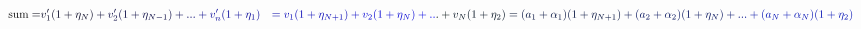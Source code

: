 \documentclass[12pt]{article}
\begin{document}
\makeatletter
\renewcommand*{\@textcolor}[3]{%
  \protect\leavevmode
  \begingroup
    \color#1{#2}#3%
  \endgroup
}
\makeatother
\begin{displaymath}
\begin{align*}\begin{align*}\begin{aligned}\mathop{\text{sum}} \mathcolor[RGB]{0,0,15}{=} & \mathcolor[RGB]{0,0,30}{v'_1(1+\eta_N)} \mathcolor[RGB]{0,0,45}{+} \mathcolor[RGB]{0,0,60}{v'_2(1+\eta_{N-1})} \mathcolor[RGB]{0,0,75}{+} \mathcolor[RGB]{0,0,90}{.} \mathcolor[RGB]{0,0,105}{.} \mathcolor[RGB]{0,0,120}{.} \mathcolor[RGB]{0,0,135}{+} \mathcolor[RGB]{0,0,150}{v'_n(1+\eta_1)} & \mathcolor[RGB]{0,0,165}{=} \mathcolor[RGB]{0,0,180}{v_1(1+\eta_{N+1})} \mathcolor[RGB]{0,0,195}{+} \mathcolor[RGB]{0,0,210}{v_2(1+\eta_N)} \mathcolor[RGB]{0,0,225}{+} \mathcolor[RGB]{0,0,240}{.} \mathcolor[RGB]{0,0,255}{.} \mathcolor[RGB]{0,15,0}{.} \mathcolor[RGB]{0,15,15}{+} \mathcolor[RGB]{0,15,30}{v_N(1+\eta_2)} & \mathcolor[RGB]{0,15,45}{=} \mathcolor[RGB]{0,15,60}{(a_1+\alpha_1)(1+\eta_{N+1})} \mathcolor[RGB]{0,15,75}{+} \mathcolor[RGB]{0,15,90}{(a_2+\alpha_2)(1+\eta_N)} \mathcolor[RGB]{0,15,105}{+} \mathcolor[RGB]{0,15,120}{.} \mathcolor[RGB]{0,15,135}{.} \mathcolor[RGB]{0,15,150}{.} \mathcolor[RGB]{0,15,165}{+} \mathcolor[RGB]{0,15,180}{(a_N+\alpha_N)(1+\eta_2)\end{aligned}\end{align*}\end{align*}}
\end{displaymath}
\end{document}
